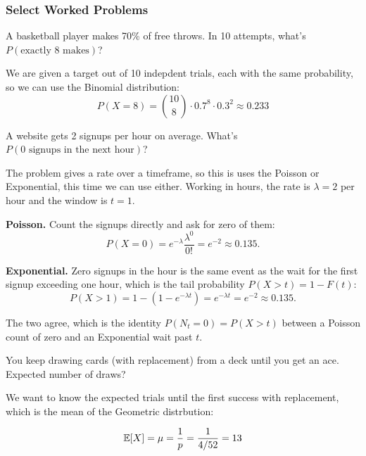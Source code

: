 \subsubsection{Select Worked Problems}

\begin{problem}
A basketball player makes 70\% of free throws. In 10 attempts, what's $P(\text{exactly 8 makes})$?
\end{problem}

\begin{solution}
We are given a target out of 10 indepdent trials, each with the same probability, so we can use the Binomial distribution:
\[
P(X = 8) = \binom{10}{8} \cdot 0.7^8 \cdot 0.3^2 \approx 0.233
\]
\end{solution}

\vspace{-2ex}

\begin{problem}
A website gets 2 signups per hour on average. What's $P(\text{0 signups in the next hour})$?
\end{problem}

\begin{solution}
The problem gives a rate over a timeframe, so this is uses the Poisson or Exponential, this time we can use either. Working in hours, the rate is $\lambda = 2$ per hour and the window is $t = 1$.

\textbf{Poisson.} Count the signups directly and ask for zero of them:
\[
P(X = 0) = e^{-\lambda}\frac{\lambda^0}{0!} = e^{-2} \approx 0.135.
\]

\textbf{Exponential.} Zero signups in the hour is the same event as the wait for the first signup exceeding one hour, which is the tail probability $P(X > t) = 1 - F(t)$:
\[
P(X > 1) = 1 - \left(1 - e^{-\lambda t}\right) = e^{-\lambda t} = e^{-2} \approx 0.135.
\]

The two agree, which is the identity $P(N_t = 0) = P(X > t)$ between a Poisson count of zero and an Exponential wait past $t$.
\end{solution}


\begin{problem}
You keep drawing cards (with replacement) from a deck until you get an ace. Expected number of draws?
\end{problem}

\begin{solution}
We want to know the expected trials until the first success with replacement, which is the mean of the Geometric distrbution:

\[
\mathbb{E}[X] = \mu = \frac{1}{p} = \frac{1}{4/52} = 13
\]
\end{solution}

